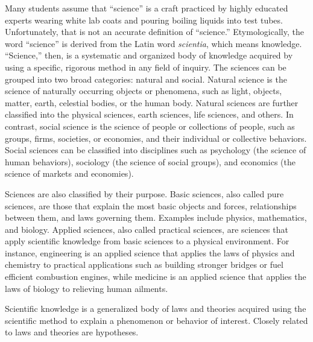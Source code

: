 Many students assume that ``science'' is a craft practiced by highly educated experts wearing white lab coats and pouring boiling liquids into test tubes. Unfortunately, that is not an accurate definition of ``science.'' Etymologically, the word ``science'' is derived from the Latin word \textit{scientia}, which means knowledge. ``Science,'' then, is a systematic and organized body of knowledge acquired by using a specific, rigorous method in any field of inquiry. The sciences can be grouped into two broad categories: natural and social. Natural science is the science of naturally occurring objects or phenomena, such as light, objects, matter, earth, celestial bodies, or the human body. Natural sciences are further classified into the physical sciences, earth sciences, life sciences, and others. In contrast, social science is the science of people or collections of people, such as groups, firms, societies, or economies, and their individual or collective behaviors. Social sciences can be classified into disciplines such as psychology (the science of human behaviors), sociology (the science of social groups), and economics (the science of markets and economies).

Sciences are also classified by their purpose. Basic sciences, also called pure sciences, are those that explain the most basic objects and forces, relationships between them, and laws governing them. Examples include physics, mathematics, and biology. Applied sciences, also called practical sciences, are sciences that apply scientific knowledge from basic sciences to a physical environment. For instance, engineering is an applied science that applies the laws of physics and chemistry to practical applications such as building stronger bridges or fuel efficient combustion engines, while medicine is an applied science that applies the laws of biology to relieving human ailments.

Scientific knowledge is a generalized body of laws and theories acquired using the scientific method to explain a phenomenon or behavior of interest. Closely related to laws and theories are hypotheses.

